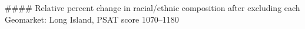 #### Relative percent change in racial/ethnic composition after excluding each Geomarket: Long Island, PSAT score 1070–1180
